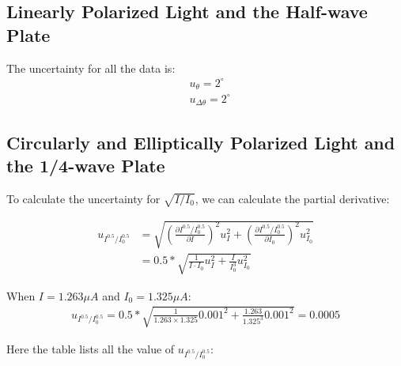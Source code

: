 \documentclass[12pt, a4paper]{article}
\begin{document}
\subsection{Linearly Polarized Light and the Half-wave Plate}
The uncertainty for all the data is:
\begin{align*}
	&u_\theta = 2^{\circ}\\
	&u_{\Delta\theta} = 2^{\circ}
\end{align*}

\subsection{Circularly and Elliptically Polarized Light and the 1/4-wave Plate}
To calculate the uncertainty for $\sqrt{I/I_0}$, we can calculate the partial derivative:

\[
\begin{aligned}
	u_{I^{0.5} / I^{0.5}_{0}} &=\sqrt{\left(\frac{\partial I^{0.5} / I^{0.5}_{0}}{\partial I}\right)^{2} u_{I}^{2}+\left(\frac{\partial I^{0.5} / I^{0.5}_{0}}{\partial I_{0}}\right)^{2} u_{I_{0}}^{2}} \\
	&=0.5*\sqrt{\frac{1}{I \cdot I_0} u_{I}^{2}+\frac{I}{I_{0}^{3}} u_{I_{0}}^{2}}
\end{aligned}
\]

When $I = 1.263 \mu A$ and $I_0 = 1.325 \mu A$:
\[
\begin{aligned}
	u_{I^{0.5} / I^{0.5}_{0}}=0.5*\sqrt{\frac{1}{1.263\times1.325} 0.001^{2}+\frac{1.263}{1.325^{3}} 0.001^{2}} = 0.0005
\end{aligned}
\]

Here the table lists all the value of $u_{I^{0.5} / I^{0.5}_{0}}$:
\end{document}
